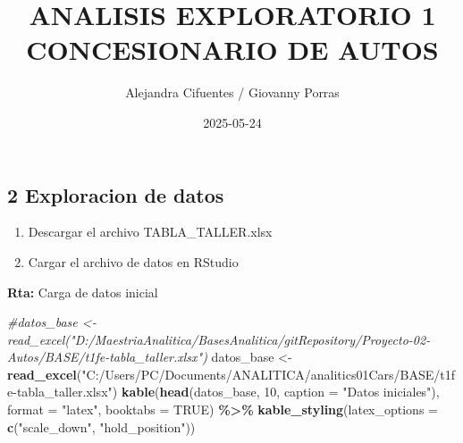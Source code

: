 \documentclass[
]{article}
\title{ANALISIS EXPLORATORIO 1 CONCESIONARIO DE AUTOS}
\author{Alejandra Cifuentes / Giovanny Porras}
\date{2025-05-24}
\newenvironment{Shaded}{\begin{snugshade}}{\end{snugshade}}
\newcommand{\AttributeTok}[1]{\textcolor[rgb]{0.13,0.29,0.53}{#1}}
\newcommand{\CommentTok}[1]{\textcolor[rgb]{0.56,0.35,0.01}{\textit{#1}}}
\newcommand{\ConstantTok}[1]{\textcolor[rgb]{0.56,0.35,0.01}{#1}}
\newcommand{\DecValTok}[1]{\textcolor[rgb]{0.00,0.00,0.81}{#1}}
\newcommand{\FunctionTok}[1]{\textcolor[rgb]{0.13,0.29,0.53}{\textbf{#1}}}
\newcommand{\NormalTok}[1]{#1}
\newcommand{\OtherTok}[1]{\textcolor[rgb]{0.56,0.35,0.01}{#1}}
\newcommand{\SpecialCharTok}[1]{\textcolor[rgb]{0.81,0.36,0.00}{\textbf{#1}}}
\newcommand{\StringTok}[1]{\textcolor[rgb]{0.31,0.60,0.02}{#1}}
\providecommand{\tightlist}{%
  \setlength{\itemsep}{0pt}\setlength{\parskip}{0pt}}
\begin{document}
\maketitle

{
\setcounter{tocdepth}{2}
\tableofcontents
}
\subsection{2 Exploracion de datos}\label{exploracion-de-datos}

\begin{enumerate}
\def\labelenumi{\alph{enumi}.}
\tightlist
\item
  Descargar el archivo TABLA\_TALLER.xlsx
\item
  Cargar el archivo de datos en RStudio
\end{enumerate}

\textbf{Rta:} Carga de datos inicial

\begin{Shaded}
\begin{Highlighting}[]
\CommentTok{\#datos\_base \textless{}{-} read\_excel("D:/MaestriaAnalitica/BasesAnalitica/gitRepository/Proyecto{-}02{-}Autos/BASE/t1fe{-}tabla\_taller.xlsx")}
\NormalTok{datos\_base }\OtherTok{\textless{}{-}} \FunctionTok{read\_excel}\NormalTok{(}\StringTok{"C:/Users/PC/Documents/ANALITICA/analitics01Cars/BASE/t1fe{-}tabla\_taller.xlsx"}\NormalTok{)}
\FunctionTok{kable}\NormalTok{(}\FunctionTok{head}\NormalTok{(datos\_base, }\DecValTok{10}\NormalTok{,  }\AttributeTok{caption =} \StringTok{"Datos iniciales"}\NormalTok{), }\AttributeTok{format =} \StringTok{"latex"}\NormalTok{, }\AttributeTok{booktabs =} \ConstantTok{TRUE}\NormalTok{) }\SpecialCharTok{\%\textgreater{}\%} 
  \FunctionTok{kable\_styling}\NormalTok{(}\AttributeTok{latex\_options =} \FunctionTok{c}\NormalTok{(}\StringTok{"scale\_down"}\NormalTok{, }\StringTok{"hold\_position"}\NormalTok{))}
\end{Highlighting}
\end{Shaded}
\end{document}
